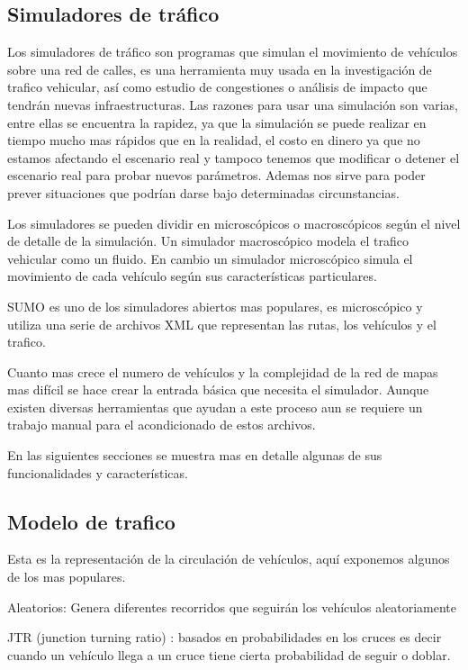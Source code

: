 \subsection{Simuladores de tráfico}
Los simuladores de tráfico son programas que simulan el movimiento de vehículos sobre una red de calles, es una herramienta muy usada en la investigación de trafico vehicular, así como estudio de congestiones o análisis de impacto que tendrán nuevas infraestructuras.  Las razones para usar una simulación son varias, entre ellas se encuentra  la rapidez, ya que la simulación se puede realizar en tiempo mucho mas rápidos que en la realidad, el costo en dinero ya que no estamos afectando el escenario real  y tampoco tenemos que modificar o detener el escenario real para probar nuevos parámetros. Ademas nos sirve para poder prever situaciones que podrían darse bajo determinadas circunstancias.

Los simuladores se pueden dividir en microscópicos o macroscópicos según el nivel de detalle de la simulación. Un simulador macroscópico modela  el trafico vehicular como un fluido. En cambio un simulador microscópico simula el movimiento de cada vehículo según sus características particulares.

SUMO\citep{SUMO} es uno de los simuladores abiertos mas populares, es microscópico y utiliza una serie de archivos  XML que representan las rutas, los vehículos y el trafico.  

Cuanto mas crece el numero de vehículos y la complejidad de la red de mapas mas difícil se hace crear la entrada básica que necesita el simulador. Aunque existen diversas herramientas que ayudan a este proceso aun se requiere un trabajo manual para el acondicionado de estos archivos.

En las siguientes secciones se muestra mas en detalle algunas de sus funcionalidades y características.


\subsection{Modelo de trafico }
Esta es la representación de la circulación de vehículos, aquí exponemos algunos de los mas populares. 

Aleatorios: Genera diferentes recorridos que seguirán los vehículos aleatoriamente

JTR (junction turning ratio) : basados en probabilidades en los cruces  es decir cuando un vehículo llega a un cruce tiene cierta probabilidad de seguir o doblar.
 
